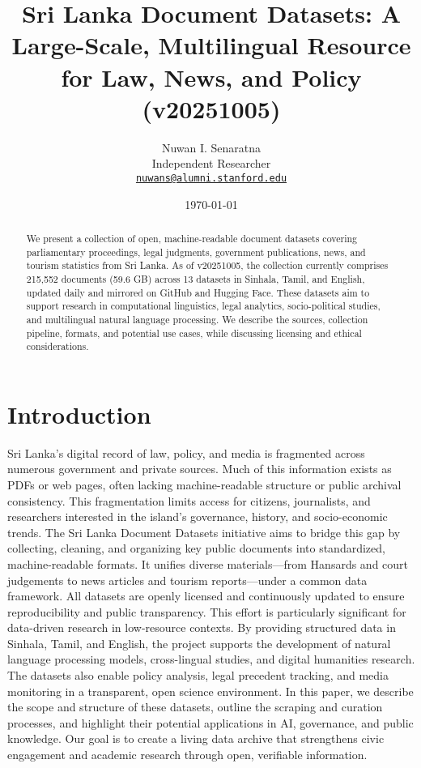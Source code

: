 \documentclass[10pt,a4paper]{article}%
\title{Sri Lanka Document Datasets: A Large{-}Scale, Multilingual Resource for Law, News, and Policy (v20251005)}%
\author{Nuwan I. Senaratna\\Independent Researcher\\\vspace{0.25em}\texttt{\href{mailto:nuwans@alumni.stanford.edu}{nuwans@alumni.stanford.edu}}}%
\date{\today}%
\begin{document}
%
\normalsize%
\maketitle%
\begin{abstract}%
We present a collection of open, machine{-}readable document datasets covering parliamentary proceedings, legal judgments, government publications, news, and tourism statistics from Sri Lanka.  As of v20251005, the collection currently comprises 215,552 documents (59.6 GB) across 13 datasets in Sinhala, Tamil, and English, updated daily and mirrored on GitHub and Hugging Face.  These datasets aim to support research in computational linguistics, legal analytics, socio{-}political studies, and multilingual natural language processing.  We describe the sources, collection pipeline, formats, and potential use cases, while discussing licensing and ethical considerations.%
\newline%
\newline%
\end{abstract}%
\section{Introduction}%
\label{sec:Introduction}%
Sri Lanka’s digital record of law, policy, and media is fragmented across numerous government and private sources. Much of this information exists as PDFs or web pages, often lacking machine{-}readable structure or public archival consistency. This fragmentation limits access for citizens, journalists, and researchers interested in the island’s governance, history, and socio{-}economic trends.%
\newline%
\newline%
The Sri Lanka Document Datasets initiative aims to bridge this gap by collecting, cleaning, and organizing key public documents into standardized, machine{-}readable formats. It unifies diverse materials—from Hansards and court judgements to news articles and tourism reports—under a common data framework. All datasets are openly licensed and continuously updated to ensure reproducibility and public transparency.%
\newline%
\newline%
This effort is particularly significant for data{-}driven research in low{-}resource contexts. By providing structured data in Sinhala, Tamil, and English, the project supports the development of natural language processing models, cross{-}lingual studies, and digital humanities research. The datasets also enable policy analysis, legal precedent tracking, and media monitoring in a transparent, open science environment.%
\newline%
\newline%
In this paper, we describe the scope and structure of these datasets, outline the scraping and curation processes, and highlight their potential applications in AI, governance, and public knowledge. Our goal is to create a living data archive that strengthens civic engagement and academic research through open, verifiable information.%
\newline%
\newline
\end{document}
